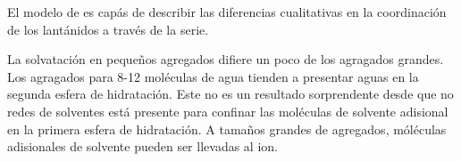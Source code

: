 El modelo de \cite{Hughe2005} es cap\'as de describir las diferencias
cualitativas en la coordinaci\'on de los lant\'anidos a trav\'es de 
la serie. 

La solvataci\'on  en peque\~nos agregados difiere un poco de los 
agragados grandes. Los agragados para 8-12 mol\'eculas de agua 
tienden a presentar aguas en la segunda esfera de hidrataci\'on. Este
no es un resultado sorprendente desde que no redes de solventes 
est\'a presente para confinar las mol\'eculas de solvente adisional
en la primera esfera de hidrataci\'on. A tama\~nos grandes de 
agregados, m\'ol\'eculas adisionales de solvente pueden ser llevadas
al ion.
